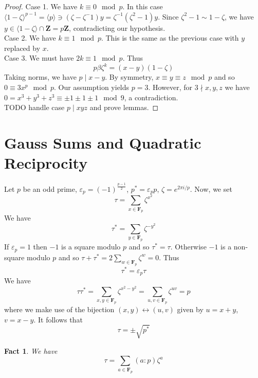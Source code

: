 \documentclass[12pt]{article}
\newtheorem*{fact*}{Fact}
\newcommand{\eps}{\varepsilon}
\newcommand{\gen}[1]{\langle#1\rangle}
\newcommand{\F}{\mathbf{F}}
\newcommand{\Z}{\mathbf{Z}}
\begin{document}
\begin{proof}
Case 1. We have $k\equiv 0\mod p$. In this case $\gen{1-\zeta}^{p-1}=\gen{p} \ni (\zeta-\zeta^-1)y = \zeta^{-1}(\zeta^2-1)y$. Since $\zeta^2-1\sim 1-\zeta$, we have $y\in\gen{1-\zeta} \cap \Z = p\Z$, contradicting our hypothesis. \\
Case 2. We have $k\equiv 1\mod p$. This is the same as the previous case with $y$ replaced by $x$. \\
Case 3. We must have $2k\equiv 1\mod p$. Thus \[p\beta \zeta^k = (x-y)(1-\zeta)\]
Taking norms, we have $p\mid x-y$. By symmetry, $x\equiv y\equiv z \mod p$ and so $0\equiv 3x^p \mod p$. Our assumption yields $p=3$. However, for $3\nmid x,y,z$ we have $0 = x^3+y^3+z^3 \equiv \pm1\pm1\pm1 \mod 9$, a contradiction. \\

TODO handle case $p\mid xyz$ and prove lemmas. %
\end{proof}


\newpage
\section{Gauss Sums and Quadratic Reciprocity}


Let $p$ be an odd prime, $\eps_p=(-1)^{\frac{p-1}{2}}$, $p^*=\eps_p p$, $\zeta = e^{2\pi i/p}$. Now, we set
\[\tau = \sum_{x\in\F_p}\zeta^{x^2}\]
We have
\[\tau^* = \sum_{y\in\F_p}\zeta^{-y^2}\]
If $\eps_p=1$ then $-1$ is a square modulo $p$ and so $\tau^*=\tau$. Otherwise $-1$ is a non-square modulo $p$ and so $\tau+\tau^*=2\sum_{w\in\F_p}\zeta^{w}=0$. 
Thus \[\tau^*=\eps_p\tau\]
We have
\[\tau\tau^* = \sum_{x,y\in\F_p}\zeta^{x^2-y^2}=\sum_{u,v\in\F_p}\zeta^{uv} = p\]
where we make use of the bijection $(x,y)\longleftrightarrow(u,v)$ given by $u=x+y$, $v=x-y$.
It follows that
\[\tau = \pm \sqrt{p^*}\]


\begin{fact*}
We have
\[\tau = \sum_{a\in\F_p}(a:p)\zeta^a\]
\end{fact*}
\end{document}

